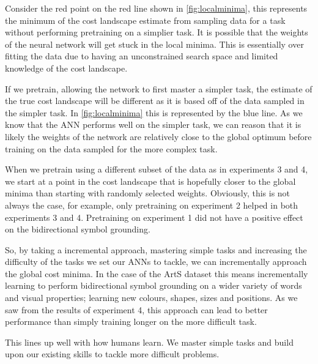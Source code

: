 Consider the red point on the red line shown in \autoref{fig:localminima}, this represents the minimum of the cost landscape estimate from sampling data for a task without performing pretraining on a simplier task. It is possible that the weights of the neural network will get stuck in the local minima. This is essentially over fitting the data due to having an unconstrained search space and limited knowledge of the cost landscape.

If we pretrain, allowing the network to first master a simpler task, the estimate of the true cost landscape will be different as it is based off of the data sampled in the simpler task. In \autoref{fig:localminima} this is represented by the blue line. As we know that the \ac{ANN} performs well on the simpler task, we can reason that it is likely the weights of the network are relatively close to the global optimum before training on the data sampled for the more complex task.


When we pretrain using a different subset of the data as in experiments 3 and 4, we start at a point in the cost landscape that is hopefully closer to the global minima than starting with randomly selected weights. Obviously, this is not always the case, for example, only pretraining on experiment 2 helped in both experiments 3 and 4. Pretraining on experiment 1 did not have a positive effect on the bidirectional symbol grounding.

So, by taking a incremental approach, mastering simple tasks and increasing the difficulty of the tasks we set our  \acp{ANN} to tackle, we can incrementally approach the global cost minima. In the case of the ArtS dataset this means incrementally learning to perform bidirectional symbol grounding on a wider variety of words and visual properties; learning new colours, shapes, sizes and positions. As we saw from the results of experiment 4, this approach can lead to better performance than simply training longer on the more difficult task.

This lines up well with how humans learn. We master simple tasks and build upon our existing skills to tackle more difficult problems.


